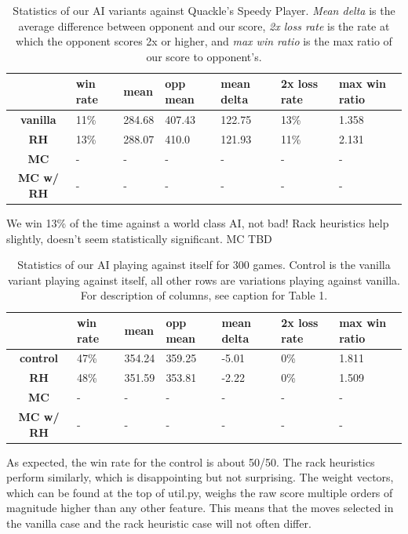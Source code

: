 \documentclass[12pt]{article}
\begin{document}
\begin{table}[h]
  \centering
  \begin{tabular}{c|l|l|l|l|l|l}
    \textbf{} & \textbf{win rate} & \textbf{mean} & \textbf{opp mean} & \textbf{mean delta} &  \textbf{2x loss rate} & \textbf{max win ratio} \\\hline
  \textbf{vanilla}   & 11\% & 284.68 & 407.43 & 122.75 & 13\% & 1.358\\
  \textbf{RH}        & 13\% & 288.07 & 410.0  & 121.93 & 11\% & 2.131 \\
  \textbf{MC}        & -    & -      & -      & -      & -    & - \\
  \textbf{MC w/ RH}  & -    & -      & -      & -      & -    & - \\
\end{tabular}
  \caption{Statistics of our AI variants against Quackle's Speedy
    Player. \emph{Mean delta} is the average difference between
    opponent and our score, \emph{2x loss rate} is the rate at which
    the opponent scores 2x or higher, and \emph{max win ratio} is the
    max ratio of our score to opponent's.}
\end{table}

We win 13\% of the time against a world class AI, not bad! Rack
heuristics help slightly, doesn't seem statistically significant. MC
TBD 

\begin{table}[h]
  \centering
  \begin{tabular}{c|l|l|l|l|l|l}
    \textbf{} & \textbf{win rate} & \textbf{mean} & \textbf{opp mean} & \textbf{mean delta} &  \textbf{2x loss rate} & \textbf{max win ratio} \\\hline
  \textbf{control}   & 47\% & 354.24 & 359.25 & -5.01  & 0\%  & 1.811\\
  \textbf{RH}        & 48\% & 351.59 & 353.81 & -2.22  & 0\%  & 1.509\\
  \textbf{MC}        & -    & -      & -      & -      & -    & - \\
  \textbf{MC w/ RH}  & -    & -      & -      & -      & -    & - \\
\end{tabular}
  \caption{Statistics of our AI playing against itself for 300
    games. Control is the vanilla variant playing against itself, all
    other rows are variations playing against vanilla. For description
    of columns, see caption for Table 1.}
\end{table}

As expected, the win rate for the control is about 50/50. The rack
heuristics perform similarly, which is disappointing but not
surprising. The weight vectors, which can be found at the top of
util.py, weighs the raw score multiple orders of magnitude higher than
any other feature. This means that the moves selected in the vanilla
case and the rack heuristic case will not often differ.
\end{document}
